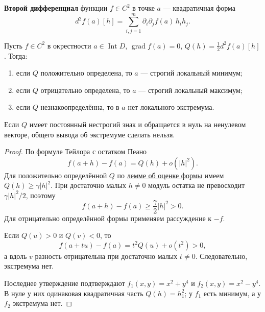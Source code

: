 \label{ticket:12}

\begin{definition}
\textbf{Второй дифференциал} функции $f\in C^2$ в точке $a$ --- квадратичная форма
\[
  d^2f(a)[h]=\sum_{i,j=1}^m\partial_i\partial_j f(a)\,h_i h_j.
\]
\end{definition}

\begin{theorem}
Пусть $f\in C^2$ в окрестности $a\in\operatorname{Int}D$, $\operatorname{grad}f(a)=0$, $Q(h)=\tfrac12 d^2f(a)[h]$.
Тогда:
\begin{enumerate}
  \item если $Q$ положительно определена, то $a$ --- строгий локальный минимум;
  \item если $Q$ отрицательно определена, то $a$ --- строгий локальный максимум;
  \item если $Q$ незнакоопределённа, то в $a$ нет локального экстремума.
\end{enumerate}
Если $Q$ имеет постоянный нестрогий знак и обращается в нуль на ненулевом векторе, общего вывода об экстремуме сделать нельзя.
\end{theorem}

\begin{proof}
По формуле Тейлора с остатком Пеано
\[
  f(a+h)-f(a)=Q(h)+o(|h|^2).
\]
Для положительно определённой $Q$ по \hyperref[ticket:11]{лемме об оценке формы} имеем $Q(h)\ge\gamma|h|^2$.
При достаточно малых $h\ne0$ модуль остатка не превосходит $\gamma|h|^2/2$, поэтому
\[
  f(a+h)-f(a)\ge\frac\gamma2|h|^2>0.
\]
Для отрицательно определённой формы применяем рассуждение к $-f$.

Если $Q(u)>0$ и $Q(v)<0$, то
\[
  f(a+tu)-f(a)=t^2Q(u)+o(t^2)>0,
\]
а вдоль $v$ разность отрицательна при достаточно малых $t\ne0$.
Следовательно, экстремума нет.

Последнее утверждение подтверждают $f_1(x,y)=x^2+y^4$ и $f_2(x,y)=x^2-y^4$.
В нуле у них одинаковая квадратичная часть $Q(h)=h_1^2$; у $f_1$ есть минимум, а у $f_2$ экстремума нет.
\end{proof}
